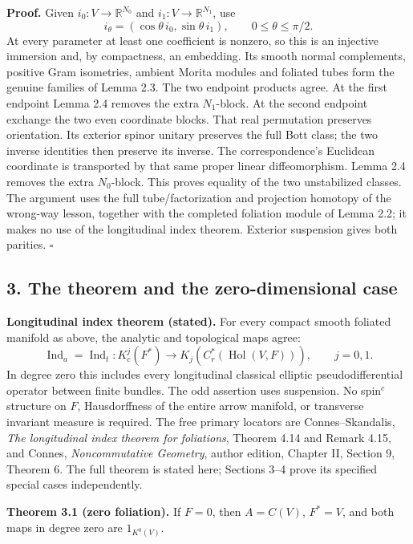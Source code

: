 \documentclass[
  11pt,
]{article}
\begin{document}
\textbf{Proof.} Given \(i_0:V\to\mathbb R^{N_0}\) and
\(i_1:V\to\mathbb R^{N_1}\), use \[
 i_\theta=(\cos\theta\,i_0,\sin\theta\,i_1),\qquad0\le\theta\le\pi/2.
\] At every parameter at least one coefficient is nonzero, so this is an
injective immersion and, by compactness, an embedding. Its smooth normal
complements, positive Gram isometries, ambient Morita modules and
foliated tubes form the genuine families of Lemma 2.3. The two endpoint
products agree. At the first endpoint Lemma 2.4 removes the extra
\(N_1\)-block. At the second endpoint exchange the two even coordinate
blocks. That real permutation preserves orientation. Its exterior spinor
unitary preserves the full Bott class; the two inverse identities then
preserve its inverse. The correspondence's Euclidean coordinate is
transported by that same proper linear diffeomorphism. Lemma 2.4 removes
the extra \(N_0\)-block. This proves equality of the two unstabilized
classes. The argument uses the full tube/factorization and projection
homotopy of the wrong-way lesson, together with the completed foliation
module of Lemma 2.2; it makes no use of the longitudinal index theorem.
Exterior suspension gives both parities. \(\square\)

\subsection{3. The theorem and the zero-dimensional
case}\label{the-theorem-and-the-zero-dimensional-case}

\textbf{Longitudinal index theorem (stated).} For every compact smooth
foliated manifold as above, the analytic and topological maps agree: \[
 \operatorname{Ind}_a=\operatorname{Ind}_t:
 K_c^j(F^*)\longrightarrow K_j(C_r^*(\operatorname{Hol}(V,F))),\qquad j=0,1.
 \tag{3.1}
\] In degree zero this includes every longitudinal classical elliptic
pseudodifferential operator between finite bundles. The odd assertion
uses suspension. No spin\(^{c}\) structure on \(F\), Hausdorffness of
the entire arrow manifold, or transverse invariant measure is required.
The free primary locators are Connes--Skandalis, \emph{The longitudinal
index theorem for foliations}, Theorem 4.14 and Remark 4.15, and Connes,
\emph{Noncommutative Geometry}, author edition, Chapter II, Section 9,
Theorem 6. The full theorem is stated here; Sections 3--4 prove its
specified special cases independently.

\textbf{Theorem 3.1 (zero foliation).} If \(F=0\), then \(A=C(V)\),
\(F^*=V\), and both maps in degree zero are \(1_{K^0(V)}\).
\end{document}

